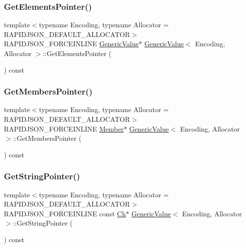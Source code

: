 \subsubsection{\texorpdfstring{Get\+Elements\+Pointer()}{GetElementsPointer()}}
{\footnotesize\ttfamily template$<$typename Encoding, typename Allocator = R\+A\+P\+I\+D\+J\+S\+O\+N\+\_\+\+D\+E\+F\+A\+U\+L\+T\+\_\+\+A\+L\+L\+O\+C\+A\+T\+OR$>$ \\
R\+A\+P\+I\+D\+J\+S\+O\+N\+\_\+\+F\+O\+R\+C\+E\+I\+N\+L\+I\+NE \hyperlink{classGenericValue}{Generic\+Value}$\ast$ \hyperlink{classGenericValue}{Generic\+Value}$<$ Encoding, Allocator $>$\+::Get\+Elements\+Pointer (\begin{DoxyParamCaption}{ }\end{DoxyParamCaption}) const\hspace{0.3cm}{\ttfamily [inline]}}

\mbox{\label{classGenericValue_a04412a15687feb103f917cdd91b32298}} 
\subsubsection{\texorpdfstring{Get\+Members\+Pointer()}{GetMembersPointer()}}
{\footnotesize\ttfamily template$<$typename Encoding, typename Allocator = R\+A\+P\+I\+D\+J\+S\+O\+N\+\_\+\+D\+E\+F\+A\+U\+L\+T\+\_\+\+A\+L\+L\+O\+C\+A\+T\+OR$>$ \\
R\+A\+P\+I\+D\+J\+S\+O\+N\+\_\+\+F\+O\+R\+C\+E\+I\+N\+L\+I\+NE \hyperlink{classGenericValue_a7ccf27c44058b4c11c3efc6473afb886}{Member}$\ast$ \hyperlink{classGenericValue}{Generic\+Value}$<$ Encoding, Allocator $>$\+::Get\+Members\+Pointer (\begin{DoxyParamCaption}{ }\end{DoxyParamCaption}) const\hspace{0.3cm}{\ttfamily [inline]}}

\mbox{\label{classGenericValue_a0f54466a07c496300b15987e1b1915f8}} 
\subsubsection{\texorpdfstring{Get\+String\+Pointer()}{GetStringPointer()}}
{\footnotesize\ttfamily template$<$typename Encoding, typename Allocator = R\+A\+P\+I\+D\+J\+S\+O\+N\+\_\+\+D\+E\+F\+A\+U\+L\+T\+\_\+\+A\+L\+L\+O\+C\+A\+T\+OR$>$ \\
R\+A\+P\+I\+D\+J\+S\+O\+N\+\_\+\+F\+O\+R\+C\+E\+I\+N\+L\+I\+NE const \hyperlink{classGenericValue_ade0e0ce64ccd5d852da57a35e720bafb}{Ch}$\ast$ \hyperlink{classGenericValue}{Generic\+Value}$<$ Encoding, Allocator $>$\+::Get\+String\+Pointer (\begin{DoxyParamCaption}{ }\end{DoxyParamCaption}) const\hspace{0.3cm}{\ttfamily [inline]}}

